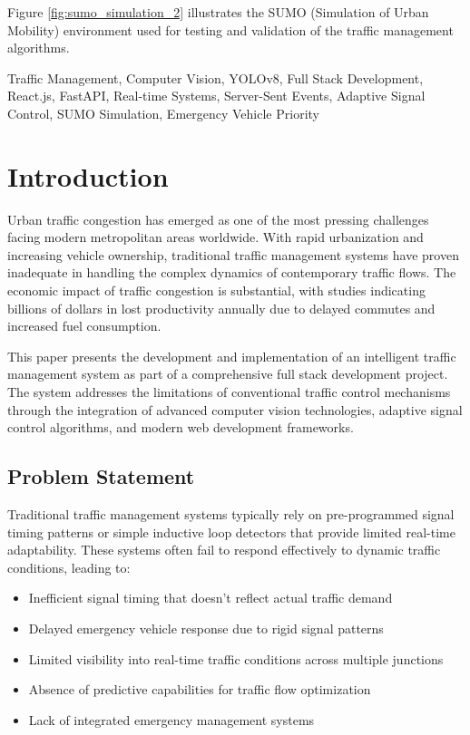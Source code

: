 \documentclass[conference]{IEEEtran}
\begin{document}
Figure \ref{fig:sumo_simulation_2} illustrates the SUMO (Simulation of Urban Mobility) environment used for testing and validation of the traffic management algorithms.

\begin{IEEEkeywords}
Traffic Management, Computer Vision, YOLOv8, Full Stack Development, React.js, FastAPI, Real-time Systems, Server-Sent Events, Adaptive Signal Control, SUMO Simulation, Emergency Vehicle Priority
\end{IEEEkeywords}

\section{Introduction}

Urban traffic congestion has emerged as one of the most pressing challenges facing modern metropolitan areas worldwide. With rapid urbanization and increasing vehicle ownership, traditional traffic management systems have proven inadequate in handling the complex dynamics of contemporary traffic flows. The economic impact of traffic congestion is substantial, with studies indicating billions of dollars in lost productivity annually due to delayed commutes and increased fuel consumption\cite{schrank2019urban}.

This paper presents the development and implementation of an intelligent traffic management system as part of a comprehensive full stack development project. The system addresses the limitations of conventional traffic control mechanisms through the integration of advanced computer vision technologies, adaptive signal control algorithms, and modern web development frameworks.

\subsection{Problem Statement}

Traditional traffic management systems typically rely on pre-programmed signal timing patterns or simple inductive loop detectors that provide limited real-time adaptability. These systems often fail to respond effectively to dynamic traffic conditions, leading to:

\begin{itemize}
\item Inefficient signal timing that doesn't reflect actual traffic demand
\item Delayed emergency vehicle response due to rigid signal patterns
\item Limited visibility into real-time traffic conditions across multiple junctions
\item Absence of predictive capabilities for traffic flow optimization
\item Lack of integrated emergency management systems
\end{itemize}
\end{document}
